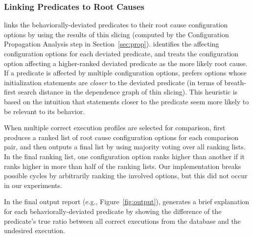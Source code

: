 \subsubsection{Linking Predicates to Root Causes}
\label{sec:linking}


\ourtool links the behaviorally-deviated
predicates to their root cause configuration options
by using the results of thin slicing (computed by the Configuration Propagation
Analysis step in Section~\ref{sec:prop}).
\ourtool identifies 
the affecting configuration options for each deviated predicate,
and treats the configuration option
affecting a higher-ranked deviated predicate as the more likely
root cause. If a predicate is affected by multiple
configuration options, \ourtool prefers options whose initialization
statements are \textit{closer} to the
deviated predicate (in terms of breath-first search
distance in the dependence graph of thin slicing).
This heuristic is based on the intuition that statements closer to the
predicate seem more likely to be relevant to its behavior.



When multiple correct execution profiles are selected for comparison,
\ourtool first produces a ranked list of root cause
configuration options for each comparison pair, and then outputs
a final list by using majority voting over all ranking lists.
In the final ranking list, one configuration option ranks higher
than another if it ranks higher in more than half of the ranking lists.
Our implementation breaks possible cycles by arbitrarily ranking the
involved options, but this did not occur in our experiments. 

In the final output report (e.g., Figure~\ref{fig:output}), \ourtool 
generates a brief explanation for each behaviorally-deviated predicate
by showing the difference of the predicate's true ratio between
all correct executions from the database and the undesired execution.




